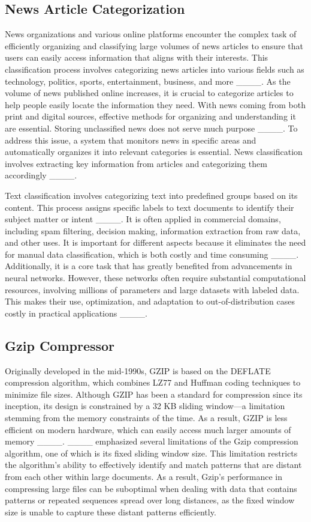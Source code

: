 \subsection{News Article Categorization}

News organizations and various online platforms encounter the complex task of efficiently organizing and classifying large volumes of news articles to ensure that users can easily access information that aligns with their interests. This classification process involves categorizing news articles into various fields such as technology, politics, sports, entertainment, business, and more ____. As the volume of news published online increases, it is crucial to categorize articles to help people easily locate the information they need. With news coming from both print and digital sources, effective methods for organizing and understanding it are essential. Storing unclassified news does not serve much purpose ____. To address this issue, a system that monitors news in specific areas and automatically organizes it into relevant categories is essential. News classification involves extracting key information from articles and categorizing them accordingly ____.

Text classification involves categorizing text into predefined groups based on its content. This process assigns specific labels to text documents to identify their subject matter or intent ____. It is often applied in commercial domains, including spam filtering, decision making, information extraction from raw data, and other uses. It is important for different aspects because it eliminates the need for manual data classification, which is both costly and time consuming ____. Additionally, it is a core task that has greatly benefited from advancements in neural networks. However, these networks often require substantial computational resources, involving millions of parameters and large datasets with labeled data. This makes their use, optimization, and adaptation to out-of-distribution cases costly in practical applications ____.

\subsection{Gzip Compressor}

Originally developed in the mid-1990s, GZIP is based on the DEFLATE compression algorithm, which combines LZ77 and Huffman coding techniques to minimize file sizes. Although GZIP has been a standard for compression since its inception, its design is constrained by a 32 KB sliding window—a limitation stemming from the memory constraints of the time. As a result, GZIP is less efficient on modern hardware, which can easily access much larger amounts of memory ____. ____ emphasized several limitations of the Gzip compression algorithm, one of which is its fixed sliding window size. This limitation restricts the algorithm's ability to effectively identify and match patterns that are distant from each other within large documents. As a result, Gzip's performance in compressing large files can be suboptimal when dealing with data that contains patterns or repeated sequences spread over long distances, as the fixed window size is unable to capture these distant patterns efficiently.

